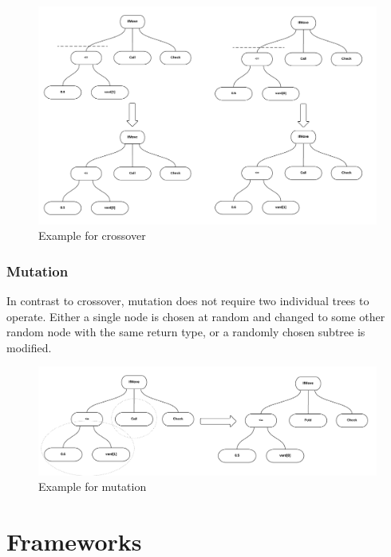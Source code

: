 \documentclass[12pt,fleqn,a4paper]{article}
\begin{document}
\begin{figure}
\begin{center}
	\includegraphics[width=1.0\textwidth]{tree_crossover.png}
\caption{Example for crossover}
\end{center}
\end{figure}

\subsubsection{Mutation}
In contrast to crossover, mutation does not require two individual trees to operate.
Either a single node is chosen at random and changed to some other random node with the same return type,
or a randomly chosen subtree is modified.

\begin{figure}
\begin{center}
	\includegraphics[width=1.0\textwidth]{tree_mutation.png}
\caption{Example for mutation}
\end{center}
\end{figure}
\newpage

\section{Frameworks}
\end{document}
